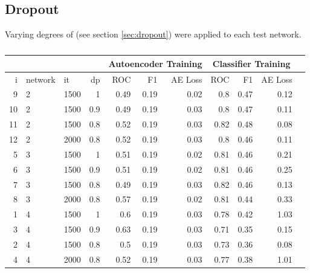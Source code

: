    \subsection{Dropout}
      Varying degrees of (see section \ref{sec:dropout}) were applied to each test network.
      \begin{table}[!h] \centering
      	{\small
      		\begin{tabular}{rllrrrrrrrr}
      			&&& &  \multicolumn{3}{|c|}{Autoencoder Training} &  \multicolumn{3}{c|}{Classifier Training}    \\
      			\hline
      			i  & network & it   & dp  & ROC  & F1   & AE Loss & ROC  & F1   & AE Loss \\
      			\hline
      			9  & 2       & 1500 & 1   & 0.49 & 0.19 & 0.02    & 0.8  & 0.47 & 0.12    \\
      			10 & 2       & 1500 & 0.9 & 0.49 & 0.19 & 0.03    & 0.8  & 0.47 & 0.11    \\
      			11 & 2       & 1500 & 0.8 & 0.52 & 0.19 & 0.03    & 0.82 & 0.48 & 0.08    \\
      			\hline
      			12 & 2       & 2000 & 0.8 & 0.52 & 0.19 & 0.03    & 0.8  & 0.46 & 0.11    \\
      			\hline
      			5  & 3       & 1500 & 1   & 0.51 & 0.19 & 0.02    & 0.81 & 0.46 & 0.21    \\
      			6  & 3       & 1500 & 0.9 & 0.51 & 0.19 & 0.02    & 0.81 & 0.46 & 0.25    \\
      			7  & 3       & 1500 & 0.8 & 0.49 & 0.19 & 0.03    & 0.82 & 0.46 & 0.13    \\
      			\hline
      			8  & 3       & 2000 & 0.8 & 0.57 & 0.19 & 0.02    & 0.81 & 0.44 & 0.33    \\
      			\hline
      			1  & 4       & 1500 & 1   & 0.6  & 0.19 & 0.03    & 0.78 & 0.42 & 1.03    \\
      			3  & 4       & 1500 & 0.9 & 0.63 & 0.19 & 0.03    & 0.71 & 0.35 & 0.15    \\
      			2  & 4       & 1500 & 0.8 & 0.5  & 0.19 & 0.03    & 0.73 & 0.36 & 0.08    \\
      			\hline
      			4  & 4       & 2000 & 0.8 & 0.52 & 0.19 & 0.03    & 0.77 & 0.38 & 1.01    \\
      			\hline
      		\end{tabular}}\caption{} \label{tab:pseaafasfrch} \end{table}


      \newpage
